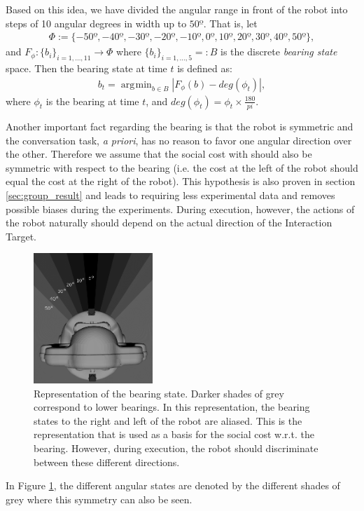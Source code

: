 \documentclass[a4paper,11pt]{report}
\DeclareMathOperator*{\argmin}{\arg\!\min}
\begin{document}
Based on this idea, we have divided the angular range in front of the robot into steps of 10 angular degrees in width up to $50º$. That is, let
\begin{align*}
  \Phi:=\{-50º,-40º,-30º,-20º,-10º,0º,10º,20º,30º,40º,50º\},
\end{align*}
and $F_\phi:\{b_i\}_{i=1,\ldots,11}\rightarrow \Phi$ where $\{b_i\}_{i=1,\ldots,5}=:B$ is the discrete \emph{bearing state} space. Then the bearing state at time $t$ is defined as:
\begin{align*}
  b_t = \argmin_{b\in B}|F_\phi(b) - deg(\phi_t)|,
\end{align*}
where $\phi_t$ is the bearing at time $t$, and $deg(\phi_t)=\phi_t\times\frac{180}{pi}$.

Another important fact regarding the bearing is that the robot is symmetric and the conversation task, \emph{a priori}, has no reason to favor one angular direction over the other. Therefore we assume that the social cost with should also be symmetric with respect to the bearing (i.e. the cost at the left of the robot should equal the cost at the right of the robot). This hypothesis is also proven in section \ref{sec:group_result} and leads to requiring less experimental data and removes possible biases during the experiments. During execution, however, the actions of the robot naturally should depend on the actual direction of the Interaction Target.


\begin{figure}
    \centering
    \includegraphics[width=0.4\textwidth]{figures/state_viz.png}
    \caption{Representation of the bearing state. Darker shades of grey correspond to lower bearings. In this representation, the bearing states to the right and left of the robot are aliased. This is the representation that is used as a basis for the social cost w.r.t. the bearing. However, during execution, the robot should discriminate between these different directions.}
    	\label{fig:state_viz}
\end{figure}
In Figure \ref{fig:state_viz}, the different angular states are denoted by the different shades of grey where this symmetry can also be seen.
\end{document}
